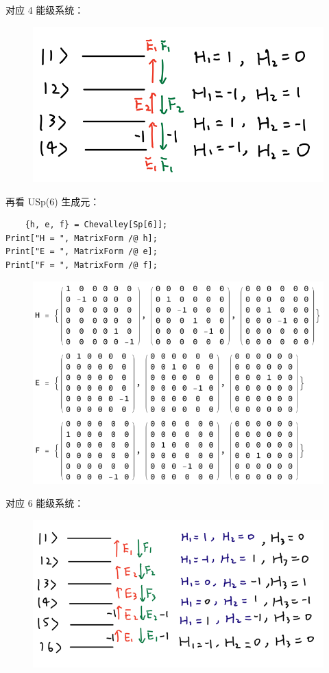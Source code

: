 \documentclass[UTF8]{ctexart}
\begin{document}
\noindent 对应 4 能级系统：

\begin{figure}[H]
\begin{centering}
\includegraphics[width=0.5\linewidth]{include/P7}
\par\end{centering}
\end{figure}

\noindent 再看 USp(6) 生成元：

\begin{verbatim}
	{h, e, f} = Chevalley[Sp[6]];
Print["H = ", MatrixForm /@ h];
Print["E = ", MatrixForm /@ e];
Print["F = ", MatrixForm /@ f];
\end{verbatim}

\begin{figure}[H]
\begin{centering}
\includegraphics[width=0.6\linewidth]{include/O20}
\par\end{centering}
\end{figure}

\noindent 对应 6 能级系统：

\begin{figure}[H]
\begin{centering}
\includegraphics[width=0.5\linewidth]{include/P8}
\par\end{centering}
\end{figure}
\end{document}
